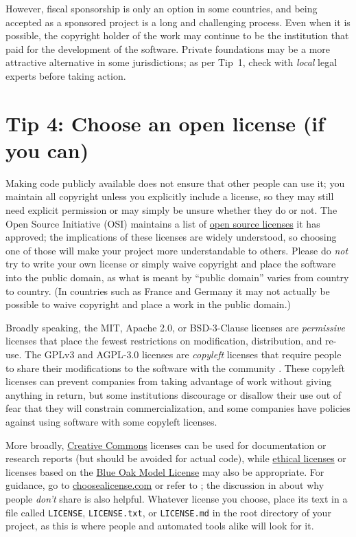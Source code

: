\documentclass[10pt,letterpaper]{article}
\begin{document}
However,
fiscal sponsorship is only an option in some countries,
and being accepted as a sponsored project is a long and challenging process.
Even when it is possible,
the copyright holder of the work may continue to be the institution that paid for the development of the software.
Private foundations may be a more attractive alternative in some jurisdictions;
as per Tip~1,
check with \emph{local} legal experts before taking action.

\section*{Tip 4: Choose an open license (if you can)}

Making code publicly available does not ensure that other people can use it;
you maintain all copyright unless you explicitly include a license,
so they may still need explicit permission
or may simply be unsure whether they do or not.
The Open Source Initiative (OSI)
maintains a list of \href{https://opensource.org/licenses}{open source licenses} it has approved;
the implications of these licenses are widely understood,
so choosing one of those will make your project more understandable to others.
Please do \emph{not} try to write your own license
or simply waive copyright and place the software into the public domain,
as what is meant by ``public domain'' varies from country to country.
(In countries such as France and Germany
it may not actually be possible to waive copyright and place a work in the public domain.)

Broadly speaking,
the MIT, Apache 2.0, or BSD-3-Clause licenses are \emph{permissive} licenses
that place the fewest restrictions on modification, distribution, and re-use.
The GPLv3 and AGPL-3.0 licenses are \emph{copyleft} licenses
that require people to share their modifications to the software with the community \cite{Morin2012}.
These copyleft licenses can prevent companies from taking advantage of work without giving anything in return,
but some institutions discourage or disallow their use out of fear that they will constrain commercialization,
and some companies have policies against using software with some copyleft licenses.

More broadly,
\href{https://creativecommons.org/}{Creative Commons} licenses can be used for documentation or research reports (but should be avoided for actual code),
while \href{https://ethicalsource.dev/}{ethical licenses}
or licenses based on the \href{https://blueoakcouncil.org/license/1.0.0}{Blue Oak Model License} may also be appropriate.
For guidance,
go to \href{http://choosealicense.com}{choosealicense.com}
or refer to \cite{Fogel2020,Fortunato2021};
the discussion in \cite{Gomes2022} about why people \emph{don't} share is also helpful.
Whatever license you choose,
place its text in a file called \texttt{LICENSE}, \texttt{LICENSE.txt}, or \texttt{LICENSE.md}
in the root directory of your project,
as this is where people and automated tools alike will look for it.
\end{document}
